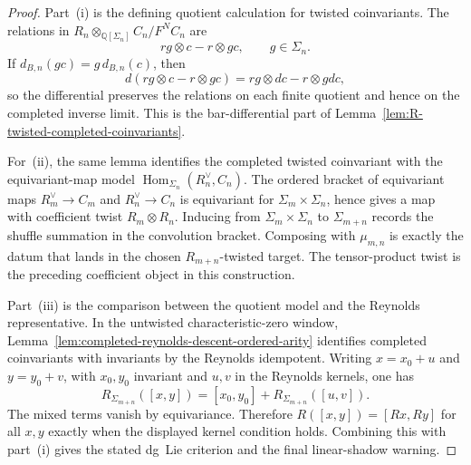 \begin{proof}
Part~\textup{(i)} is the defining quotient calculation for twisted
coinvariants.  The relations in
\(R_n\otimes_{\mathbb Q[\Sigma_n]} C_n/F^NC_n\) are
\[
rg\otimes c-r\otimes gc,\qquad g\in\Sigma_n .
\]
If \(d_{B,n}(gc)=g\,d_{B,n}(c)\), then
\[
d(rg\otimes c-r\otimes gc)
=rg\otimes d c-r\otimes g d c,
\]
so the differential preserves the relations on each finite quotient
and hence on the completed inverse limit.  This is the
bar-differential part of
Lemma~\ref{lem:R-twisted-completed-coinvariants}.

For~\textup{(ii)}, the same lemma identifies the completed twisted
coinvariant with the equivariant-map model
\(\operatorname{Hom}_{\Sigma_n}(R_n^\vee,C_n)\).  The ordered bracket
of equivariant maps
\(R_m^\vee\to C_m\) and \(R_n^\vee\to C_n\) is equivariant for
\(\Sigma_m\times\Sigma_n\), hence gives a map with coefficient
twist \(R_m\otimes R_n\).  Inducing from
\(\Sigma_m\times\Sigma_n\) to \(\Sigma_{m+n}\) records the shuffle
summation in the convolution bracket.  Composing with
\(\mu_{m,n}\) is exactly the datum that lands in the chosen
\(R_{m+n}\)-twisted target.  The tensor-product twist is the preceding
coefficient object in this construction.

Part~\textup{(iii)} is the comparison between the quotient model and
the Reynolds representative.  In the untwisted characteristic-zero
window, Lemma~\ref{lem:completed-reynolds-descent-ordered-arity}
identifies completed coinvariants with invariants by the Reynolds
idempotent.  Writing \(x=x_0+u\) and \(y=y_0+v\), with
\(x_0,y_0\) invariant and \(u,v\) in the Reynolds kernels, one has
\[
R_{\Sigma_{m+n}}([x,y])
=[x_0,y_0]+R_{\Sigma_{m+n}}([u,v]).
\]
The mixed terms vanish by equivariance.  Therefore
\(R([x,y])=[R x,R y]\) for all \(x,y\) exactly when the displayed
kernel condition holds.  Combining this with part~\textup{(i)} gives
the stated dg~Lie criterion and the final linear-shadow warning.
\end{proof}

